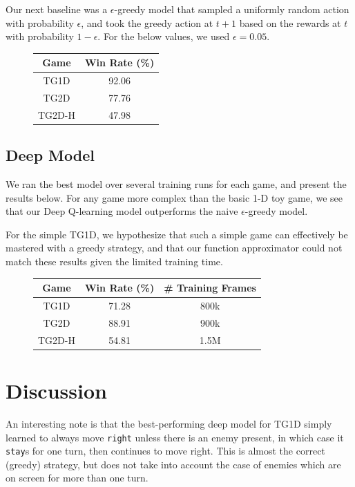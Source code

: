 \documentclass[9pt,journal]{IEEEtran}
\begin{document}
Our next baseline was a $\epsilon$-greedy model that sampled a uniformly random action with probability $\epsilon$, and took the greedy action at $t+1$ based on the rewards at $t$ with probability $1 - \epsilon$. For the below values, we used $\epsilon = 0.05$.

\begin{figure}[ht]
  \begin{tabular}{c | c}
    Game & Win Rate (\%) \\ \hline
    TG1D & 92.06 \\
    TG2D & 77.76 \\
    TG2D-H & 47.98 \\
  \end{tabular}
  \centering
\end{figure}

\subsection{Deep Model}

We ran the best model over several training runs for each game, and present the results below. For any game more complex than the basic 1-D toy game, we see that our Deep Q-learning model outperforms the naive $\epsilon$-greedy model.

For the simple TG1D, we hypothesize that such a simple game can effectively be mastered with a greedy strategy, and that our function approximator could not match these results given the limited training time.

\begin{figure}[ht]
  \begin{tabular}{c | c | c}
    Game & Win Rate (\%) & \# Training Frames \\ \hline
    TG1D & 71.28 & 800k \\
    TG2D & 88.91 & 900k \\
    TG2D-H & 54.81 & 1.5M \\
  \end{tabular}
  \centering
\end{figure}

\section{Discussion}

An interesting note is that the best-performing deep model for TG1D simply learned to always move \texttt{right} unless there is an enemy present, in which case it \texttt{stay}s for one turn, then continues to move right. This is almost the correct (greedy) strategy, but does not take into account the case of enemies which are on screen for more than one turn.
\end{document}
